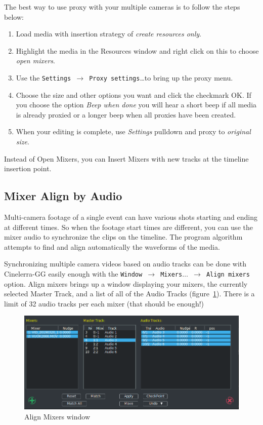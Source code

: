 The best way to use proxy with your multiple cameras is to follow the steps below:

\begin{enumerate}
    \item Load media with insertion strategy of \textit{create resources only}.
    \item Highlight the media in the Resources window and right click on this to choose \textit{open mixers}.
    \item Use the \texttt{Settings $\rightarrow$ Proxy settings}\dots to bring up the proxy menu.
    \item Choose the size and other options you want and click the checkmark OK. If you choose the option \textit{Beep when done} you will hear a short beep if all media is already proxied or a longer beep when all proxies have been created.
    \item When your editing is complete, use \textit{Settings} pulldown and proxy to \textit{original size}.
\end{enumerate}

Instead of Open Mixers, you can Insert Mixers with new tracks at the timeline insertion point.

\subsection{Mixer Align by Audio}%
\label{sub:mixer_align_audio}

Multi-camera footage of a single event can have various shots starting and ending at different times. So when the footage start times are different, you can use the mixer audio to synchronize the clips on the timeline. The program algorithm attempts to find and align automatically the waveforms of the media.

Synchronizing multiple camera videos based on audio tracks can be done with Cinelerra-GG easily enough with the \texttt{Window $\rightarrow$ Mixers$\dots$ $\rightarrow$  Align mixers} option.  Align mixers brings up a window displaying your mixers, the currently selected Master Track, and a list of all of the Audio Tracks (figure~\ref{fig:mixer-align01}).  There is a limit of 32 audio tracks per each mixer (that should be enough!)

\begin{figure}[htpb]
    \centering
    \includegraphics[width=0.9\linewidth]{images/mixer-align01.png}
    \caption{Align Mixers window}
    \label{fig:mixer-align01}
\end{figure}

